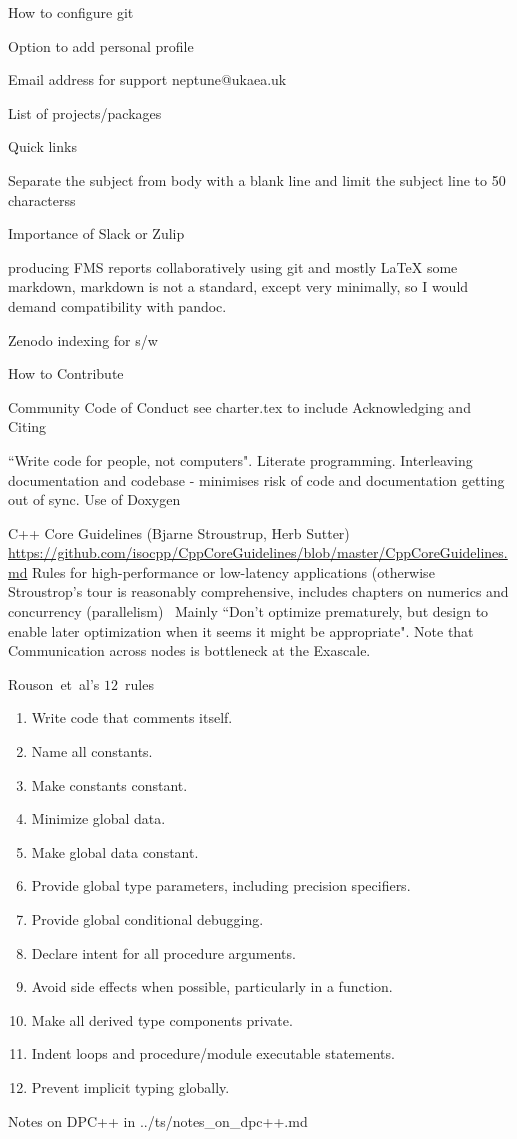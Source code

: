 
How to configure git

Option to add personal profile

Email address for support neptune@ukaea.uk

List of projects/packages

Quick links

Separate the subject from body with a blank line and limit the subject line to 50 characterss

Importance of Slack or Zulip

producing FMS reports collaboratively using git and mostly LaTeX some markdown,
markdown is not a standard, except very minimally, so I would demand compatibility with pandoc.

Zenodo indexing for s/w

How to Contribute

Community Code of Conduct see charter.tex
to include  Acknowledging and Citing

``Write code for people, not computers".
Literate programming. Interleaving documentation and codebase - minimises risk of code and documentation getting out of sync.
Use of Doxygen

C++ Core Guidelines (Bjarne Stroustrup, Herb Sutter)
\url{https://github.com/isocpp/CppCoreGuidelines/blob/master/CppCoreGuidelines.md}
Rules for high-performance or low-latency applications (otherwise Stroustrop's tour is 
reasonably comprehensive, includes chapters on numerics and
concurrency (parallelism)~\cite[\S\S\,14,15]{stroustroptour}
Mainly ``Don't optimize prematurely, but design to enable later optimization when it seems
it might be appropriate". Note that
Communication across nodes is \exc bottleneck at the Exascale.

Rouson~et~al's $12$~rules
\begin{enumerate}
\item Write code that comments itself.
\item Name all constants.
\item Make constants constant.
\item Minimize global data.
\item Make global data constant.
\item Provide global type parameters, including precision specifiers.
\item Provide global conditional debugging.
\item Declare intent for all procedure arguments.
\item Avoid side effects when possible, particularly in a function.
\item Make all derived type components private.
\item Indent loops and procedure/module executable statements.
\item Prevent implicit typing globally.
\end{enumerate}

Notes on DPC++ in ../ts/notes\_on\_dpc++.md

